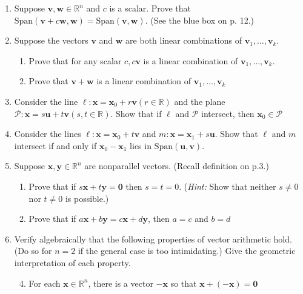 \documentclass[letterpaper]{article}
\begin{document}
\begin{enumerate}
\begin{enumerate}
  
  \item
  Suppose $\mathbf{v},\mathbf{w}\in \mathbb{R}^n$ and $c$ is a scalar. Prove that $\text{Span}(\mathbf{v}+c\mathbf{w},\mathbf{w})=\text{Span}(\mathbf{v},\mathbf{w})$. (See the blue box on p. 12.)
  \item
  Suppose  the vectors $\mathbf{v}$ and $\mathbf{w}$ are both linear combinations of $\mathbf{v}_1,\dots,\mathbf{v}_k$.
    \begin{enumerate}
    \item
    Prove that for any scalar $c,c\mathbf{v}$ is a linear combination of $\mathbf{v}_1,\dots,\mathbf{v}_k$.
    \item
    Prove that $\mathbf{v}+\mathbf{w}$ is a linear combination of $\mathbf{v}_1,\dots,\mathbf{v}_k$
    \end{enumerate}
  \item
  Consider the line $\ell: \mathbf{x}=\mathbf{x}_0+r\mathbf{v} (r\in \mathbb{R})$ and the plane $\mathcal{P}: \mathbf{x}=s\mathbf{u}+t\mathbf{v} (s,t\in \mathbb{R})$. Show that if $\ell$ and $\mathcal{P}$ intersect, then $\mathbf{x}_0\in \mathcal{P}$
  \item
  Consider the lines $\ell: \mathbf{x}=\mathbf{x}_0+t\mathbf{v}$ and $\mathit{m}: \mathbf{x}=\mathbf{x}_1+s\mathbf{u}$. Show that $\ell$ and $\mathit{m}$ intersect if and only if $\mathbf{x}_0-\mathbf{x}_1$ lies in $\text{Span}(\mathbf{u},\mathbf{v})$.
  \item
  Suppose $\mathbf{x},\mathbf{y}\in \mathbb{R}^n$ are nonparallel vectors. (Recall definition on p.3.)
    \begin{enumerate}
    \item
    Prove that if $s\mathbf{x}+t\mathbf{y}=\mathbf{0}$ then $s=t=0$. ({\it Hint:} Show that neither $s\ne 0$ nor $t\ne 0$ is possible.)
    \item
    Prove that if $a\mathbf{x}+b\mathbf{y}=c\mathbf{x}+d\mathbf{y}$, then $a=c$ and $b=d$
    \end{enumerate}
  \setcounter{enumii}{27}
  \item
  Verify algebraically that the following properties of vector arithmetic hold. (Do so for $n=2$ if the general case is too intimidating.) Give the geometric interpretation of each property.
    \begin{enumerate}
    \setcounter{enumiii}{3}
    \item
    For each $\mathbf{x}\in \mathbb{R}^n$, there is a vector $-\mathbf{x}$ so that $\mathbf{x}+(-\mathbf{x})=\mathbf{0}$
    \end{enumerate}
  \end{enumerate}
\end{enumerate}
\end{document}
